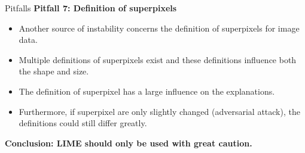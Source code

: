 \documentclass[11pt,compress,t,notes=noshow, xcolor=table]{beamer}
\begin{document}
\begin{vbframe}{Pitfalls}
\textbf{Pitfall 7: Definition of superpixels}
\begin{itemize}
	\item Another source of instability concerns the definition of superpixels for image data. 
	\item Multiple definitions of superpixels exist and these definitions influence both the shape and size. 
	\item The definition of superpixel has a large influence on the explanations. 
	\item Furthermore, if superpixel are only slightly changed (adversarial attack), the definitions could still differ greatly.  
\end{itemize}

\textbf{Conclusion: LIME should only be used with great caution.}

\end{vbframe}

%	


\endlecture
\end{document}
